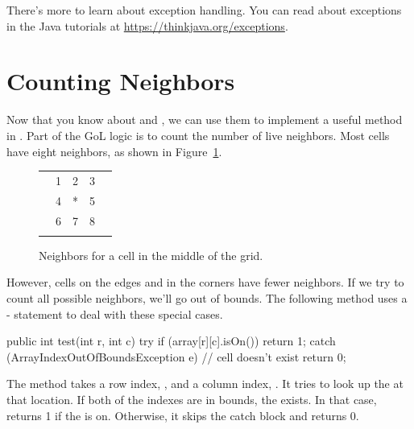 There's more to learn about exception handling.
You can read about exceptions in the Java tutorials at \url{https://thinkjava.org/exceptions}.


\section{Counting Neighbors}


Now that you know about  and , we can use them to implement a useful method in .
Part of the GoL logic is to count the number of live neighbors.
Most cells have eight neighbors, as shown in Figure~\ref{fig:neighbors}.

\begin{figure}[!ht]
\begin{center}
\begin{tabular}{|p{1em}|p{1em}|p{1em}|p{1em}|p{1em}|}
\hline
  &   &   &   &   \\
\hline
  & 1 & 2 & 3 &   \\
\hline
  & 4 & * & 5 &   \\
\hline
  & 6 & 7 & 8 &   \\
\hline
  &   &   &   &   \\
\hline
\end{tabular}
\caption{Neighbors for a cell in the middle of the grid.}
\label{fig:neighbors}
\end{center}
\end{figure}

However, cells on the edges and in the corners have fewer neighbors.
If we try to count all possible neighbors, we'll go out of bounds.
The following method uses a - statement to deal with these special cases.

\begin{code}
public int test(int r, int c) {
    try {
        if (array[r][c].isOn()) {
            return 1;
        }
    } catch (ArrayIndexOutOfBoundsException e) {
        // cell doesn't exist
    }
    return 0;
}
\end{code}

The  method takes a row index, , and a column index, .
It tries to look up the  at that location.
If both of the indexes are in bounds, the  exists.
In that case,  returns 1 if the  is on.
Otherwise, it skips the catch block and returns 0.

